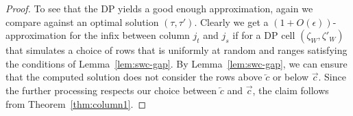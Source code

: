 \begin{proof}
    To see that the DP yields a good enough approximation, again we compare against an optimal solution $(\tau,\tau')$.
    Clearly we get a $(1+O(\epsilon))$-approximation for the infix between column $j_t$ and $j_s$ if for a DP cell $(\zeta_W,\zeta'_W)$ that simulates a choice of rows that is uniformly at random and ranges satisfying the conditions of Lemma~\ref{lem:swc-gap}.
    By Lemma~\ref{lem:swc-gap}, we can ensure that the computed solution does not consider the rows above $\overleftarrow{c}$ or below $\overrightarrow{c}$.
    Since the further processing respects our choice between $\overleftarrow{c}$ and $\overrightarrow{c}$, the claim follows from Theorem~\ref{thm:column1}. 
\end{proof}

%
